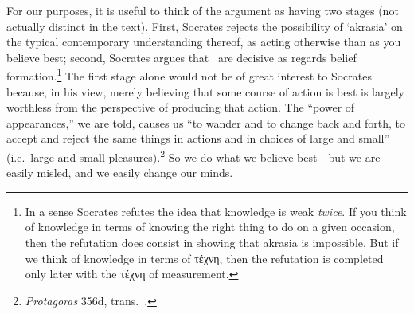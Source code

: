 \documentclass[11pt,letterpaper,oneside]{amsart} %
\begin{document}


For our purposes, it is useful to think of the argument as having two stages (not actually distinct in the text). First, Socrates rejects the possibility of `akrasia' on the typical contemporary understanding thereof, \ie as acting otherwise than as you believe best; second, Socrates argues that \technai\ are decisive as regards belief formation.\footnote{In a sense Socrates refutes the idea that knowledge is weak \emph{twice}. If you think of knowledge in terms of knowing the right thing to do on a given occasion, then the refutation does consist in showing that akrasia is impossible. But if we think of knowledge in terms of τέχνη, then the refutation is completed only later with the τέχνη of measurement.} The first stage alone would not be of great interest to Socrates because, in his view, merely believing that some course of action is best is largely worthless from the perspective of producing that action. The ``power of appearances,'' we are told, causes us ``to wander and to change back and forth, to accept and reject the same things in actions and in choices of large and small'' (i.e.\ large and small pleasures).\footnote{\emph{Protagoras} 356d, trans.\ .} So we do what we believe best---but we are easily misled, and we easily change our minds.




\end{document}
